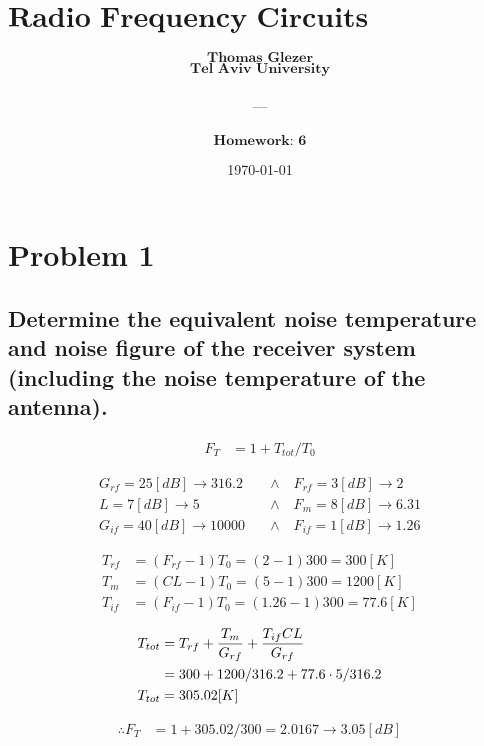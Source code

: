 \documentclass[12pt, letterpaper]{article}
\title{
  \Large $\textbf{Radio Frequency Circuits \& Antenna}$
}
\author{
  $\textbf{Thomas Glezer}$\\
  $\textbf{Tel Aviv University}$\\\\
  ---\\\\
  $\textbf{Homework: 6}$\\
}
\date{\today}
\begin{document}
\begin{titlingpage}
  \maketitle
\end{titlingpage}

\section*{Problem 1}

\subsection{Determine the equivalent noise temperature and noise figure of the receiver system (including the noise temperature of the antenna).}

\begin{align}
  F_T
  &=
  1
  +
  T_{tot}/T_0
\end{align}

\begin{align}
  G_{rf}
  =
  25[dB]
  \rightarrow
  316.2
  \quad&\wedge\quad
  F_{rf}
  =
  3[dB]
  \rightarrow
  2
  \\
  L
  =
  7[dB]
  \rightarrow
  5
  \quad&\wedge\quad
  F_{m}
  =
  8[dB]
  \rightarrow
  6.31
  \\
  G_{if}
  =
  40[dB]
  \rightarrow
  10000
  \quad&\wedge\quad
  F_{if}
  =
  1[dB]
  \rightarrow
  1.26
\end{align}

\begin{align}
  T_{rf}
  &=
  (F_{rf}-1)T_0
  =
  (2-1)300=300[K]
  \\
  T_m
  &=
  (CL-1)T_0
  =
  (5-1)300=1200[K]
  \\
  T_{if}
  &=
  (F_{if}-1)T_0
  =
  (1.26-1)300=77.6[K]
\end{align}

\begin{align}
  T_{tot}
  &=
  T_{rf}
  +
  {T_m\over G_{rf}}
  +
  {T_{if}CL\over G_{rf}}
  \\
  &=
  300
  +
  {1200/316.2}
  +
  77.6\cdot5/316.2
  \\
  T_{tot}
  &=
  305.02[K]
\end{align}

\begin{align}
  \therefore
  F_T
  &=
  1
  +
  305.02/300
  =
  2.0167
  \rightarrow
  3.05[dB]
\end{align}
\end{document}
